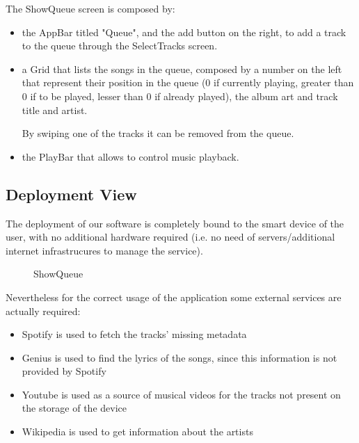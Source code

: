 \documentclass{article}
\begin{document}
The ShowQueue screen is composed by:
\begin{itemize}
    \item the AppBar titled "Queue", and the
        add button on the right, to add a track to the queue through the
        SelectTracks screen.
    \item a Grid that lists the songs in the queue, composed by a number on the
        left that represent their position in the queue (0 if currently playing,
        greater than 0 if to be played, lesser than 0 if already played), the
        album art and track title and artist.

        By swiping one of the tracks it can be removed from the queue.
    \item the PlayBar that allows to control music playback.
\end{itemize}

\subsection{Deployment View}

The deployment of our software is completely bound to the smart device of the
user, with no additional hardware required (i.e. no need of servers/additional
internet infrastrucures to manage the service). 

\begin{figure}[H]
	\noindent
	\caption{ShowQueue}
\end{figure}

Nevertheless for the correct usage of the application some external services are
actually required: 

\begin{itemize}
    \item Spotify is used to fetch the tracks' missing metadata
    \item Genius is used to find the lyrics of the songs, since this information
    is not provided by Spotify
    \item Youtube is used as a source of musical videos for the tracks not
    present on the storage of the device
    \item Wikipedia is used to get information about the artists
\end{itemize}
\end{document}
